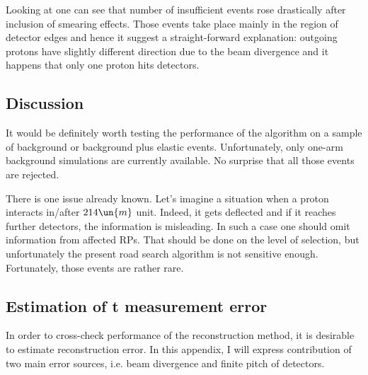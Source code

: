 Looking at  one can see that number of insufficient events rose drastically after inclusion of smearing effects. Those events take place mainly in the region of detector edges and hence it suggest a straight-forward explanation: outgoing protons have slightly different direction due to the beam divergence and it happens that only one proton hits detectors.



\subsection[disc]{Discussion}

It would be definitely worth testing the performance of the algorithm on a sample of background or background plus elastic events. Unfortunately, only one-arm background simulations are currently available. No surprise that all those events are rejected.

There is one issue already known. Let's imagine a situation when a proton interacts in/after $214\un{m}$ unit. Indeed, it gets deflected and if it reaches further detectors, the information is misleading. In such a case one should omit information from affected RPs. That should be done on the level of selection, but unfortunately the present road search algorithm is not sensitive enough. Fortunately, those events are rather rare.

\iffalse
In order to avoid those problems, it is necessary to improve the selection algorithm. Instead of road search algorithm, one can use a proper pattern recognition algorithm with pattern defined by \Eq{track general}. This can be implemented on the level of elastic reconstruction or better a lever lower. Instead of (current) selecting hits RP by RP, this might be done using all hits available. This might be very useful in the case a detector has more than one hit. Using information from other detectors, one may remove the ambiguity in pairing $u$ and $v$ strips. This needs to be discussed.
\fi


\subsection[appendix]{Estimation of t measurement error}

In order to cross-check performance of the reconstruction method, it is desirable to estimate reconstruction error. In this appendix, I will express contribution of two main error sources, i.e. beam divergence and finite pitch of detectors.

